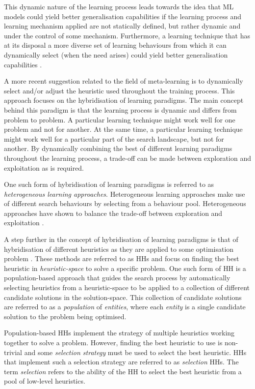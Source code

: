 This dynamic nature of the learning process leads towards the
idea that \ac{ML} models could yield better generalisation capabilities if the
learning process and learning mechanism applied are not statically defined, but
rather dynamic and under the control of some mechanism. Furthermore, a learning technique that has at its disposal a more diverse set
of learning behaviours from which it can dynamically select (when the need arises) could yield better generalisation capabilities \cite{ref:huang:2009}.

A more recent suggestion related to the field of meta-learning is to dynamically select and/or adjust the heuristic used throughout the training process. This approach focuses on the hybridisation of learning paradigms. The main concept behind this paradigm is that the learning process is dynamic and differs from problem to problem. A particular learning technique might work well for one problem and not for another. At the same time, a particular learning technique might work well for a particular part of the search landscape, but not for another. By dynamically combining the best of different learning paradigms throughout the learning process, a trade-off can be made between exploration and exploitation as is required.

One such form of hybridisation of learning paradigms is referred to as \textit{heterogeneous learning approaches}. Heterogeneous learning approaches make use of different search behaviours by selecting from a behaviour pool. Heterogeneous approaches have shown to balance the trade-off between exploration and exploitation \cite{ref:nepomuceno:2013}.

A step further in the concept of hybridisation of learning paradigms is that of hybridisation of different heuristics as they are applied to some optimisation problem \cite{ref:burke:2013}. These methods are referred to as \acfp{HH} and focus on finding the best heuristic in \textit{heuristic-space} to solve a specific problem. One such form of \ac{HH} is a
population-based approach that guides the search process by automatically
selecting heuristics from a heuristic-space to be applied to a collection of
different candidate solutions in the solution-space. This collection of
candidate solutions are referred to as a \textit{population} of
\textit{entities}, where each \textit{entity} is a single candidate solution to
the problem being optimised.

Population-based \acp{HH} implement the strategy of multiple heuristics working
together to solve a problem. However, finding the best heuristic to use is
non-trivial and some \textit{selection strategy} must be used to select the best
heuristic. \acp{HH} that implement such a selection strategy are referred to as
\textit{selection} \acp{HH}. The term \textit{selection} refers to the ability
of the \ac{HH} to select the best heuristic from a pool of low-level heuristics.

